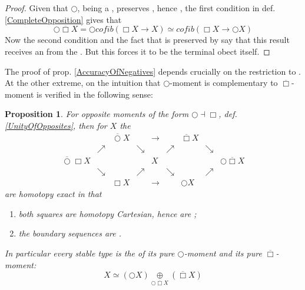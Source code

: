 \documentclass[12pt,titlepage]{article}
\newcommand{\itexarray}[1]{\begin{matrix}#1\end{matrix}}
\theoremstyle{plain}
\newtheorem{prop}{Proposition}
\theoremstyle{definition}
\theoremstyle{remark}
\begin{document}
\begin{proof}
Given that $\bigcirc$, being a , preserves , hence , the first condition in def. \ref{CompleteOpposition} gives that
\begin{displaymath}
\bigcirc \overline{\Box} X
=
\bigcirc cofib(\Box X \to X)
\simeq
cofib(\Box X \to \bigcirc X)
\end{displaymath}
Now the second condition and the fact that  is preserved by  say that this result receives an  from the . But this forces it to be the terminal obect itself.
\end{proof}
The proof of prop. \ref{AccuracyOfNegatives} depends crucially on the restriction to . At the other extreme, on  the intuition that $\bigcirc$-moment is complementary to $\overline{\Box}$-moment is verified in the following sense:
\begin{prop}
\label{TheHexagon}\hypertarget{TheHexagon}{}
For opposite moments of the form $\bigcirc \dashv \Box$, def. \ref{UnityOfOpposites}, then for  $X$ the 
\begin{displaymath}
\itexarray{
&& \overline{\bigcirc} X && \longrightarrow && \overline{\Box} X
\\
&\nearrow& &\searrow& & \nearrow && \searrow
\\
\overline{\bigcirc} \Box X && && X && && \bigcirc \overline{\Box} X
\\
&\searrow& &\nearrow & & \searrow && \nearrow
\\
&& \Box X && \longrightarrow && \bigcirc X
}
\end{displaymath}
are homotopy exact in that
\begin{enumerate}%
\item both squares are homotopy Cartesian, hence are ;
\item the boundary sequences are .
\end{enumerate}
In particular every stable type is the  of its pure $\bigcirc$-moment and its pure $\overline{\Box}$-moment:
\begin{displaymath}
X \simeq (\bigcirc X) \underset{\bigcirc \overline{\Box} X}{\oplus} (\overline{\Box} X)
\end{displaymath}
\end{prop}
\end{document}
